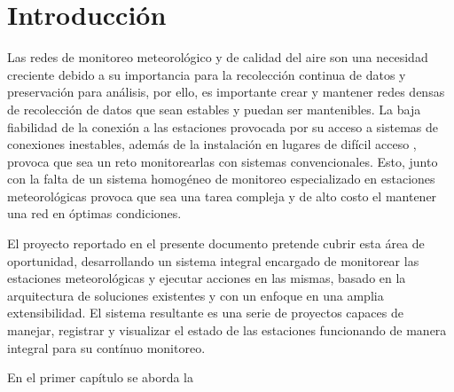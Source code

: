 \chapter*{Introducción}\label{introduccion}


Las redes de monitoreo meteorológico y de calidad del aire son una necesidad creciente debido a su importancia para la recolección continua de datos y preservación para análisis, por ello, es importante crear y mantener redes densas de recolección de datos que sean estables y puedan ser mantenibles. La baja fiabilidad de la conexión a las estaciones provocada por su acceso a sistemas de conexiones inestables, además de la instalación en lugares de difícil acceso \cite{muller_sensors_and_the_city}, provoca que sea un reto monitorearlas con sistemas convencionales. Esto, junto con la falta de un sistema homogéneo de monitoreo especializado en estaciones meteorológicas provoca que sea una tarea compleja y de alto costo el mantener una red en óptimas condiciones.

El proyecto reportado en el presente documento pretende cubrir esta área de oportunidad, desarrollando un sistema integral encargado de monitorear las estaciones meteorológicas y ejecutar acciones en las mismas, basado en la arquitectura de soluciones existentes y con un enfoque en una amplia extensibilidad. El sistema resultante es una serie de proyectos capaces de manejar, registrar y visualizar el estado de las estaciones funcionando de manera integral para su contínuo monitoreo.

En el primer capítulo se aborda la

